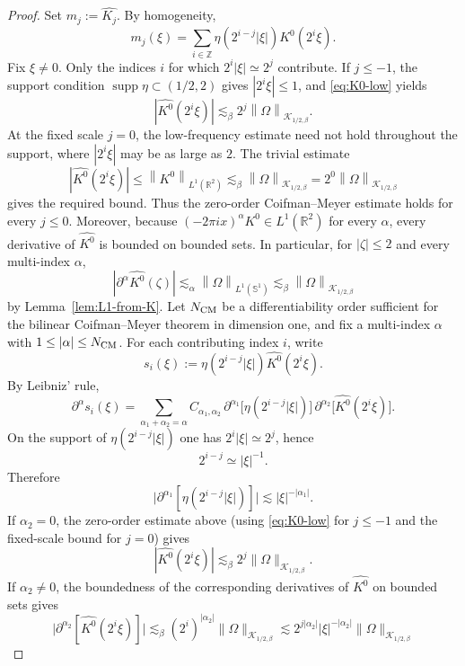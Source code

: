 \documentclass[11pt]{amsart}
\theoremstyle{remark}
\numberwithin{equation}{section}
\newcommand{\R}{\mathbb R}
\newcommand{\Sph}{\mathbb S^1}
\newcommand{\cK}{\mathcal K}
\newcommand{\norm}[1]{\left\lVert #1\right\rVert}
\newcommand{\abs}[1]{\left\lvert #1\right\rvert}
\newcommand{\supp}{\operatorname{supp}}
\newcommand{\p}{\partial}
\begin{document}
	\begin{proof}
		Set \(m_j:=\widehat{K_j}\). By homogeneity,
		\[
		m_j(\xi)=\sum_{i\in\mathbb Z}\eta(2^{i-j}\abs{\xi})\widehat{K^0}(2^i\xi).
		\]
		Fix \(\xi\neq0\). Only the indices \(i\) for which
		\(2^i\abs{\xi}\simeq2^j\) contribute. If \(j\le-1\), the support condition
		\(\supp\eta\subset(1/2,2)\) gives \(|2^i\xi|\le1\), and
		\eqref{eq:K0-low} yields
		\[
		\abs{\widehat{K^0}(2^i\xi)}
		\lesssim_\beta 2^j\norm{\Omega}_{\cK_{1/2,\beta}}.
		\]
		At the fixed scale \(j=0\), the low-frequency estimate need not hold throughout
		the support, where \(|2^i\xi|\) may be as large as \(2\). The trivial estimate
		\[
		\abs{\widehat{K^0}(2^i\xi)}
		\le \norm{K^0}_{L^1(\R^2)}
		\lesssim_\beta \norm{\Omega}_{\cK_{1/2,\beta}}
		=2^0\norm{\Omega}_{\cK_{1/2,\beta}}
		\]
		gives the required bound. Thus the zero-order Coifman--Meyer estimate holds
		for every \(j\le0\).
		Moreover, because \((-2\pi ix)^\alpha K^0\in L^1(\R^2)\) for every \(\alpha\),
		every derivative of \(\widehat{K^0}\) is bounded on bounded sets. In particular,
		for \(|\zeta|\le2\) and every multi-index \(\alpha\),
		\[
		\abs{\p^\alpha\widehat{K^0}(\zeta)}\lesssim_\alpha \norm{\Omega}_{L^1(\Sph)}
		\lesssim_\beta \norm{\Omega}_{\cK_{1/2,\beta}}
		\]
		by Lemma~\ref{lem:L1-from-K}. Let \(N_{\rm CM}\) be a differentiability order
		sufficient for the bilinear Coifman--Meyer theorem in dimension one, and fix a
		multi-index \(\alpha\) with \(1\le |\alpha|\le N_{\rm CM}\). For each
		contributing index \(i\), write
		\[
		s_i(\xi):=\eta(2^{i-j}|\xi|)\widehat{K^0}(2^i\xi).
		\]
		By Leibniz' rule,
		\[
		\partial^\alpha s_i(\xi)
		=
		\sum_{\alpha_1+\alpha_2=\alpha}
		C_{\alpha_1,\alpha_2}\,
		\partial^{\alpha_1}\bigl[\eta(2^{i-j}|\xi|)\bigr]\,
		\partial^{\alpha_2}\bigl[\widehat{K^0}(2^i\xi)\bigr].
		\]
		On the support of \(\eta(2^{i-j}|\xi|)\) one has \(2^i|\xi|\simeq 2^j\), hence
		\[
		2^{i-j}\simeq |\xi|^{-1}.
		\]
		Therefore
		\[
		\bigl|\partial^{\alpha_1}[\eta(2^{i-j}|\xi|)]\bigr|
		\lesssim |\xi|^{-|\alpha_1|}.
		\]
		If \(\alpha_2=0\), the zero-order estimate above (using
		\eqref{eq:K0-low} for \(j\le-1\) and the fixed-scale bound for \(j=0\)) gives
		\[
		|\widehat{K^0}(2^i\xi)|
		\lesssim_\beta 2^j\|\Omega\|_{\cK_{1/2,\beta}}.
		\]
		If \(\alpha_2\ne0\), the boundedness of the corresponding derivatives of
		\(\widehat{K^0}\) on bounded sets gives
		\[
		\bigl|\partial^{\alpha_2}[\widehat{K^0}(2^i\xi)]\bigr|
		\lesssim_\beta
		(2^i)^{|\alpha_2|}\|\Omega\|_{\cK_{1/2,\beta}}
		\lesssim
		2^{j|\alpha_2|}|\xi|^{-|\alpha_2|}\|\Omega\|_{\cK_{1/2,\beta}}
\]
\end{proof}
\end{document}
